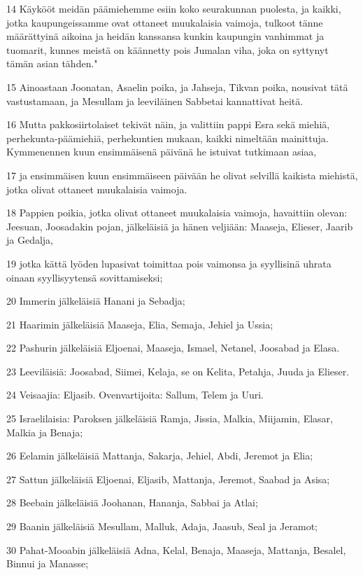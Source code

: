 \par 14 Käykööt meidän päämiehemme esiin koko seurakunnan puolesta, ja kaikki, jotka kaupungeissamme ovat ottaneet muukalaisia vaimoja, tulkoot tänne määrättyinä aikoina ja heidän kanssansa kunkin kaupungin vanhimmat ja tuomarit, kunnes meistä on käännetty pois Jumalan viha, joka on syttynyt tämän asian tähden."
\par 15 Ainoastaan Joonatan, Asaelin poika, ja Jahseja, Tikvan poika, nousivat tätä vastustamaan, ja Mesullam ja leeviläinen Sabbetai kannattivat heitä.
\par 16 Mutta pakkosiirtolaiset tekivät näin, ja valittiin pappi Esra sekä miehiä, perhekunta-päämiehiä, perhekuntien mukaan, kaikki nimeltään mainittuja. Kymmenennen kuun ensimmäisenä päivänä he istuivat tutkimaan asiaa,
\par 17 ja ensimmäisen kuun ensimmäiseen päivään he olivat selvillä kaikista miehistä, jotka olivat ottaneet muukalaisia vaimoja.
\par 18 Pappien poikia, jotka olivat ottaneet muukalaisia vaimoja, havaittiin olevan: Jeesuan, Joosadakin pojan, jälkeläisiä ja hänen veljiään: Maaseja, Elieser, Jaarib ja Gedalja,
\par 19 jotka kättä lyöden lupasivat toimittaa pois vaimonsa ja syyllisinä uhrata oinaan syyllisyytensä sovittamiseksi;
\par 20 Immerin jälkeläisiä Hanani ja Sebadja;
\par 21 Haarimin jälkeläisiä Maaseja, Elia, Semaja, Jehiel ja Ussia;
\par 22 Pashurin jälkeläisiä Eljoenai, Maaseja, Ismael, Netanel, Joosabad ja Elasa.
\par 23 Leeviläisiä: Joosabad, Siimei, Kelaja, se on Kelita, Petahja, Juuda ja Elieser.
\par 24 Veisaajia: Eljasib. Ovenvartijoita: Sallum, Telem ja Uuri.
\par 25 Israelilaisia: Paroksen jälkeläisiä Ramja, Jissia, Malkia, Miijamin, Elasar, Malkia ja Benaja;
\par 26 Eelamin jälkeläisiä Mattanja, Sakarja, Jehiel, Abdi, Jeremot ja Elia;
\par 27 Sattun jälkeläisiä Eljoenai, Eljasib, Mattanja, Jeremot, Saabad ja Asisa;
\par 28 Beebain jälkeläisiä Joohanan, Hananja, Sabbai ja Atlai;
\par 29 Baanin jälkeläisiä Mesullam, Malluk, Adaja, Jaasub, Seal ja Jeramot;
\par 30 Pahat-Mooabin jälkeläisiä Adna, Kelal, Benaja, Maaseja, Mattanja, Besalel, Binnui ja Manasse;

